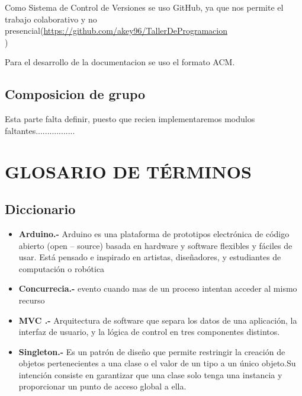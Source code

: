\documentclass[letterpaper,12pt]{article}
\begin{document}
{Como Sistema de Control de Versiones se uso GitHub, ya que nos permite el trabajo colaborativo y no presencial(\url{https://github.com/akey96/TallerDeProgramacion}\\)


Para el desarrollo de la documentacion se uso el formato ACM.

\subsection{Composicion de grupo}

Esta parte falta definir, puesto que recien implementaremos modulos faltantes.................




\newpage
\section{GLOSARIO DE TÉRMINOS}
\subsection{Diccionario}
\begin{itemize}
	
	\item \textbf{Arduino.- } Arduino es una plataforma de prototipos electrónica de código abierto (open – source) basada en hardware y software flexibles y  fáciles de usar. Está pensado e inspirado en artistas, diseñadores, y estudiantes de computación o robótica
	
	\item \textbf{Concurrecia.- } evento cuando  mas de un proceso intentan acceder al mismo recurso 
	
	\item \textbf{MVC .- }Arquitectura de software que separa los datos de una aplicación, la interfaz de usuario, y la lógica de control en tres componentes distintos.
	
	\item \textbf{Singleton.- } Es un patrón de diseño que permite restringir la creación de objetos pertenecientes a una clase o el valor de un tipo a un único objeto.Su intención consiste en garantizar que una clase solo tenga una instancia y proporcionar un punto de acceso global a ella.
	

\end{itemize}}
\end{document}
